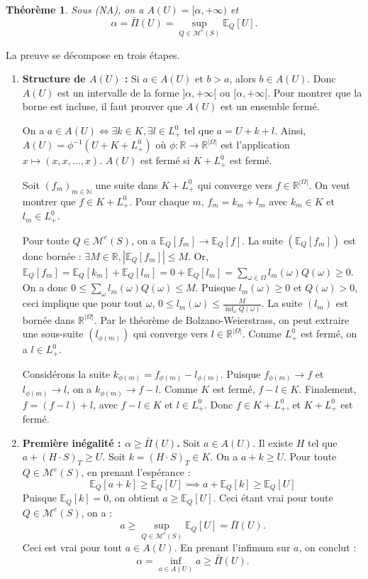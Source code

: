 \documentclass[12pt,a4paper]{article}
\makeatletter
\numberwithin{equation}{section}
\theoremstyle{plain} %
\newtheorem{theoreme}{Théorème}              %
\theoremstyle{definition} %
\theoremstyle{remark} %
\theoremstyle{myexample}
\theoremstyle{definition}
\renewenvironment{proof}[1][\proofname]{%
  \par\vspace{0.8em}%
  \pushQED{\qed}%
  \normalfont\color{cyan}%
  \topsep6\p@\@plus6\p@\relax
  \trivlist
  \item[\hskip\labelsep\bfseries\color{cyan}#1\@addpunct{.}]\ignorespaces
}{%
  \popQED\endtrivlist\vspace{0.8em}%
}
\newcommand{\E}{\mathbb{E}}
\newcommand{\RR}{\mathbb{R}}
\makeatother
\begin{document}
\begin{theoreme}\label{thm:superhedging_equals_upper_envelope}
Sous (NA), on a $A(U)=[\alpha,+\infty)$ et
\[
\alpha=\bar\Pi(U)=\sup_{Q\in\mathcal{M}^e(S)} \E_Q[U].
\]
\end{theoreme}

\begin{proof}
La preuve se décompose en trois étapes.
\begin{enumerate}
    \item \textbf{Structure de $A(U)$ :} Si $a \in A(U)$ et $b > a$, alors $b \in A(U)$. Donc $A(U)$ est un intervalle de la forme $]\alpha, +\infty[$ ou $[\alpha, +\infty[$. Pour montrer que la borne est incluse, il faut prouver que $A(U)$ est un ensemble fermé.
    
    On a $a \in A(U) \iff \exists k \in K, \exists l \in L_+^0$ tel que $a = U+k+l$.
    Ainsi, $A(U) = \phi^{-1}(U+K+L_+^0)$ où $\phi: \RR \to \RR^{|\Omega|}$ est l'application $x \mapsto (x, x, \dots, x)$.
    $A(U)$ est fermé si $K+L_+^0$ est fermé.
    
    Soit $(f_m)_{m \in \mathbb{N}}$ une suite dans $K+L_+^0$ qui converge vers $f \in \RR^{|\Omega|}$. On veut montrer que $f \in K+L_+^0$.
    Pour chaque $m$, $f_m = k_m + l_m$ avec $k_m \in K$ et $l_m \in L_+^0$.
    
    Pour toute $Q \in \mathcal{M}^e(S)$, on a $\E_Q[f_m] \to \E_Q[f]$. La suite $(\E_Q[f_m])$ est donc bornée : $\exists M \in \RR, |\E_Q[f_m]| \leq M$.
    Or, $\E_Q[f_m] = \E_Q[k_m] + \E_Q[l_m] = 0 + \E_Q[l_m] = \sum_{\omega \in \Omega} l_m(\omega)Q(\omega) \geq 0$.
    On a donc $0 \leq \sum_{\omega} l_m(\omega)Q(\omega) \leq M$.
    Puisque $l_m(\omega) \geq 0$ et $Q(\omega)>0$, ceci implique que pour tout $\omega$, $0 \leq l_m(\omega) \leq \frac{M}{\inf_\omega Q(\omega)}$.
    La suite $(l_m)$ est bornée dans $\RR^{|\Omega|}$. Par le théorème de Bolzano-Weierstrass, on peut extraire une sous-suite $(l_{\phi(m)})$ qui converge vers $l \in \RR^{|\Omega|}$. Comme $L_+^0$ est fermé, on a $l \in L_+^0$.
    
    Considérons la suite $k_{\phi(m)} = f_{\phi(m)} - l_{\phi(m)}$. Puisque $f_{\phi(m)} \to f$ et $l_{\phi(m)} \to l$, on a $k_{\phi(m)} \to f-l$.
    Comme $K$ est fermé, $f-l \in K$.
    Finalement, $f = (f-l) + l$, avec $f-l \in K$ et $l \in L_+^0$. Donc $f \in K+L_+^0$, et $K+L_+^0$ est fermé.
    
    \item \textbf{Première inégalité : $\alpha \geq \bar\Pi(U)$.}
    Soit $a \in A(U)$. Il existe $H$ tel que $a + (H \cdot S)_T \geq U$.
    Soit $k = (H \cdot S)_T \in K$. On a $a+k \geq U$.
    Pour toute $Q \in \mathcal{M}^e(S)$, en prenant l'espérance :
    \[
    \E_Q[a+k] \geq \E_Q[U] \implies a + \E_Q[k] \geq \E_Q[U]
    \]
    Puisque $\E_Q[k]=0$, on obtient $a \geq \E_Q[U]$. Ceci étant vrai pour toute $Q \in \mathcal{M}^e(S)$, on a :
    \[
    a \geq \sup_{Q \in \mathcal{M}^e(S)} \E_Q[U] = \bar\Pi(U).
    \]
    Ceci est vrai pour tout $a \in A(U)$. En prenant l'infimum sur $a$, on conclut :
    \[
    \alpha = \inf_{a \in A(U)} a \geq \bar\Pi(U).
    \]
    

\end{enumerate}
\end{proof}
\end{document}
